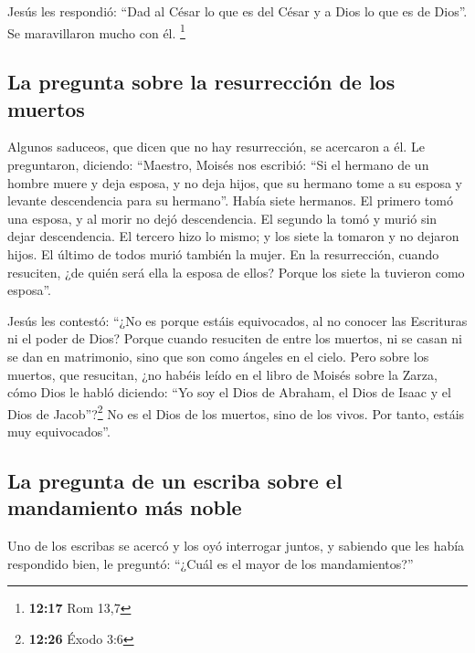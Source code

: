  Jesús les respondió: ``Dad al César lo que es del César
y a Dios lo que es de Dios''. Se maravillaron mucho con él. \footnote{\textbf{12:17}
  Rom 13,7}

\hypertarget{la-pregunta-sobre-la-resurrecciuxf3n-de-los-muertos}{%
\subsection{La pregunta sobre la resurrección de los
muertos}\label{la-pregunta-sobre-la-resurrecciuxf3n-de-los-muertos}}

 Algunos saduceos, que dicen que no hay resurrección, se
acercaron a él. Le preguntaron, diciendo:  ``Maestro,
Moisés nos escribió: ``Si el hermano de un hombre muere y deja esposa, y
no deja hijos, que su hermano tome a su esposa y levante descendencia
para su hermano''.  Había siete hermanos. El primero tomó
una esposa, y al morir no dejó descendencia.  El segundo
la tomó y murió sin dejar descendencia. El tercero hizo lo mismo;
 y los siete la tomaron y no dejaron hijos. El último de
todos murió también la mujer.  En la resurrección, cuando
resuciten, ¿de quién será ella la esposa de ellos? Porque los siete la
tuvieron como esposa''.

 Jesús les contestó: ``¿No es porque estáis equivocados,
al no conocer las Escrituras ni el poder de Dios?  Porque
cuando resuciten de entre los muertos, ni se casan ni se dan en
matrimonio, sino que son como ángeles en el cielo.  Pero
sobre los muertos, que resucitan, ¿no habéis leído en el libro de Moisés
sobre la Zarza, cómo Dios le habló diciendo: ``Yo soy el Dios de
Abraham, el Dios de Isaac y el Dios de Jacob''?\footnote{\textbf{12:26}
  Éxodo 3:6}  No es el Dios de los muertos, sino de los
vivos. Por tanto, estáis muy equivocados''.

\hypertarget{la-pregunta-de-un-escriba-sobre-el-mandamiento-muxe1s-noble}{%
\subsection{La pregunta de un escriba sobre el mandamiento más
noble}\label{la-pregunta-de-un-escriba-sobre-el-mandamiento-muxe1s-noble}}

 Uno de los escribas se acercó y los oyó interrogar
juntos, y sabiendo que les había respondido bien, le preguntó: ``¿Cuál
es el mayor de los mandamientos?''

